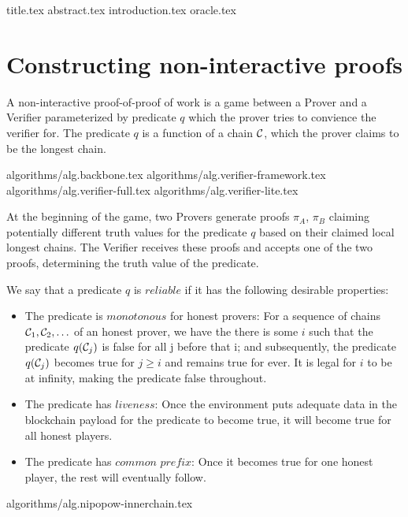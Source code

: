 \documentclass[11pt]{llncs}
\begin{document}
{title.tex}
\thispagestyle{plain}
{abstract.tex}
{introduction.tex}
{oracle.tex}

\section{Constructing non-interactive proofs}

A non-interactive proof-of-proof of work is a game between a Prover and a
Verifier parameterized by predicate $q$ which the prover tries to convience the
verifier for. The predicate $q$ is a function of a chain $\mathcal{C}$, which the
prover claims to be the longest chain.

{algorithms/alg.backbone.tex}
{algorithms/alg.verifier-framework.tex}
{algorithms/alg.verifier-full.tex}
{algorithms/alg.verifier-lite.tex}

At the beginning of the game, two Provers generate proofs $\pi_A$, $\pi_B$
claiming potentially different truth values for the predicate $q$ based on
their claimed local longest chains. The Verifier receives these proofs and
accepts one of the two proofs, determining the truth value of the predicate.

We say that a predicate $q$ is $\textit{reliable}$ if it has the following
desirable properties:

\begin{itemize}
    \item The predicate is $\textit{monotonous}$ for honest provers: For a
        sequence of chains $\mathcal{C} _1, \mathcal{C} _2, \ldots$ of an honest prover, we
        have the there is some $i$ such that the predicate $q(\mathcal{C} _j)$ is
        false for all j before that i; and subsequently, the predicate
        $q(\mathcal{C} _j)$ becomes true for $j \geq i$ and remains true for ever.
        It is legal for $i$ to be at infinity, making the predicate false
        throughout.
    \item The predicate has $\textit{liveness}$: Once the environment puts
        adequate data in the blockchain payload for the predicate to become
        true, it will become true for all honest players.
    \item The predicate has $\textit{common prefix}$: Once it becomes true for
        one honest player, the rest will eventually follow.
\end{itemize}

{algorithms/alg.nipopow-innerchain.tex}
\end{document}
